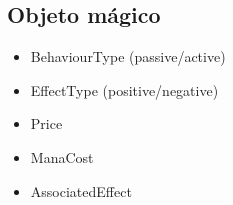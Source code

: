 \subsection{Objeto mágico}
\begin{itemize}
    \item BehaviourType (passive/active)
    \item EffectType (positive/negative)
    \item Price
    \item ManaCost
    \item AssociatedEffect
\end{itemize}